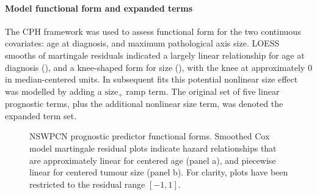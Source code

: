 \documentclass[dissertation.tex]{subfiles}
\begin{document}
\paragraph{Model functional form and expanded terms}
The \gls{CPH} framework was used to assess functional form for the two continuous covariates: age at diagnosis, and maximum pathological axis size.  \gls{LOESS} smooths of martingale residuals \cite{Therneau1990} indicated a largely linear relationship for age at diagnosis (), and a knee-shaped form for size (), with the knee at approximately $0$ in median-centered units.  In subsequent fits this potential nonlinear size effect was modelled by adding a $\mbox{size}_+$ ramp term.  The original set of five linear prognostic terms, plus the additional nonlinear size term, was denoted the expanded term set.

\begin{figure}
\centering
\caption[Prognostic predictor functional forms]{\gls{NSWPCN} prognostic predictor functional forms. Smoothed Cox model martingale residual plots indicate hazard relationships that are approximately linear for centered age (panel a), and piecewise linear for centered tumour size (panel b).  For clarity, plots have been restricted to the residual range $[-1,1]$.}
\label{fig:nomo-funcform}
\end{figure}
\end{document}
